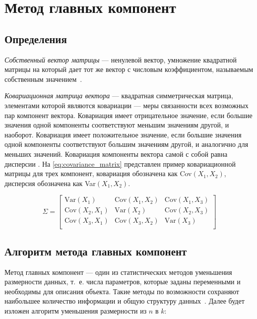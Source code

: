 \chapter{Метод главных компонент}

\section*{Определения}

\textit{Собственный вектор матрицы} --- ненулевой вектор, умножение квадратной матрицы на который дает тот же вектор с числовым коэффициентом, называемым собственным значением~\cite{linal}.

\textit{Ковариационная матрица вектора} --- квадратная симметрическая матрица, элементами которой являются ковариации --- меры связанности всех возможных пар компонент вектора. Ковариация имеет отрицательное значение, если большие значения одной компоненты соответствуют меньшим значениям другой, и наоборот. Ковариация имеет положительное значение, если большие значения одной компоненты соответствуют большим значениям другой, и аналогично для меньших значений. Ковариация компоненты вектора самой с собой равна дисперсии \cite{teorver}. На \eqref{eq:covariance_matrix} представлен пример ковариационной матрицы для трех компонент, ковариация обозначена как Cov$(X_1, X_2)$, дисперсия обозначена как Var$(X_1, X_2)$.

\begin{equation}\label{eq:covariance_matrix}
	\Sigma = 
	\begin{bmatrix}
		\text{Var}(X_1) & \text{Cov}(X_1, X_2) & \text{Cov}(X_1, X_3) \\
		\text{Cov}(X_2, X_1) & \text{Var}(X_2) & \text{Cov}(X_2, X_3) \\
		\text{Cov}(X_3, X_1) & \text{Cov}(X_3, X_2) & \text{Var}(X_3) \\
	\end{bmatrix}
\end{equation}

\section*{Алгоритм метода главных компонент}

Метод главных компонент --- один из статистических методов уменьшения размерности данных, т.~е. числа параметров, которые заданы переменными и необходимы для описания объекта. Такие методы по возможности сохраняют наибольшее количество информации и общую структуру данных~\cite{orlov, polyak}. Далее будет изложен алгоритм уменьшения размерности из $n$ в $k$:

